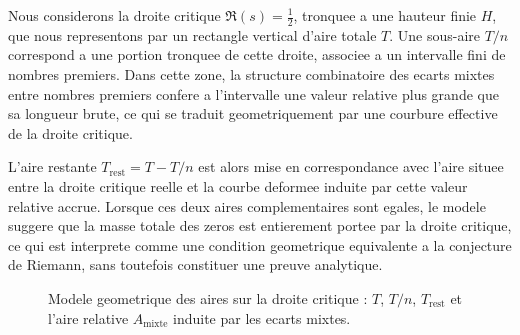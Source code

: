 \documentclass[a4paper,11pt]{article}
\begin{document}
Nous considerons la droite critique $\Re(s)=\tfrac{1}{2}$, tronquee a une
hauteur finie $H$, que nous representons par un rectangle vertical d'aire
totale $T$. Une sous-aire $T/n$ correspond a une portion tronquee de cette
droite, associee a un intervalle fini de nombres premiers. Dans cette zone,
la structure combinatoire des ecarts mixtes entre nombres premiers confere
a l'intervalle une valeur relative plus grande que sa longueur brute, ce
qui se traduit geometriquement par une courbure effective de la droite
critique.

L'aire restante $T_{\text{rest}} = T - T/n$ est alors mise en correspondance
avec l'aire situee entre la droite critique reelle et la courbe deformee
induite par cette valeur relative accrue. Lorsque ces deux aires
complementaires sont egales, le modele suggere que la masse totale des
zeros est entierement portee par la droite critique, ce qui est interprete
comme une condition geometrique equivalente a la conjecture de Riemann,
sans toutefois constituer une preuve analytique.

\begin{figure}[h]
  \centering
  \caption{Modele geometrique des aires sur la droite critique : $T$,
  $T/n$, $T_{\text{rest}}$ et l'aire relative $A_{\text{mixte}}$ induite
  par les ecarts mixtes.}
\end{figure}
\end{document}
